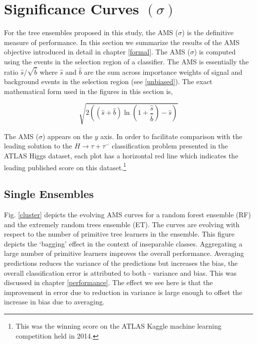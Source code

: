 \section{Significance Curves \texorpdfstring{$(\sigma)$}{}}
\label{sig}

For the tree ensembles proposed in this study, the AMS ($\sigma$) is the definitive measure of performance. In this section we summarize the results of the AMS objective introduced in detail in chapter \ref{formal}. The AMS ($\sigma$) is computed using the events in the selection region of a classifier. The AMS is essentially the ratio $\hat{s}/\sqrt{\hat{b}}$ where $\hat{s}$ and $\hat{b}$ are the sum across importance weights of signal and background events in the selection region (see \ref{unbiased}). The exact mathematical form used in the figures in this section is, 

\begin{equation}
\sqrt{2((\hat{s} + \hat{b})\ln(1 + \frac{\hat{s}}{\hat{b}})-\hat{s})} 
\end{equation} 

The AMS ($\sigma$) appears on the $y$ axis. In order to facilitate comparison with the leading solution to the $H \rightarrow \tau{+}\tau^{-}$ classification problem presented in the ATLAS Higgs dataset, each plot has a horizontal red line which indicates the leading published score on this dataset.\footnote{This was the winning score on the ATLAS Kaggle machine learning competition held in 2014.} 

\subsection{Single Ensembles}

Fig. \ref{cluster} depicts the evolving AMS curves for a random forest ensemble (RF) and the extremely random trees ensemble (ET). The curves are evolving with respect to the number of primitive tree learners in the ensemble. This figure depicts the `bagging' effect in the context of inseparable classes. Aggregating a large number of primitive learners improves the overall performance. Averaging predictions reduces the variance of the predictions but increases the bias, the overall classification error is attributed to both - variance and bias. This was discussed in chapter \ref{performance}. The effect we see here is that the improvement in error due to reduction in variance is large enough to offset the increase in bias due to averaging.  

